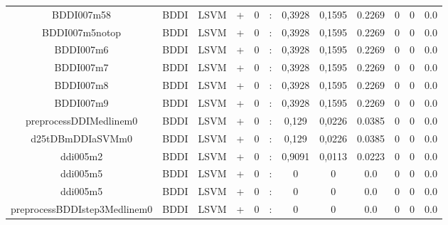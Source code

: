 \documentclass[a4paper]{article}
\begin{document}
\begin{landscape}
\begin{center}
\begin{tabular}{ |c|c|c|c|c|c|c|c|c|c|c|c|}
 
 	
 	\small{ BDDI007m58 } & BDDI & LSVM & +  &  0 &  :  &  0,3928 & 0,1595 & 0.2269  &  0 & 0 & 0.0 \\
 	

 
 	
 	\small{ BDDI007m5notop } & BDDI & LSVM & +  &  0 &  :  &  0,3928 & 0,1595 & 0.2269  &  0 & 0 & 0.0 \\
 	

 
 	
 	\small{ BDDI007m6 } & BDDI & LSVM & +  &  0 &  :  &  0,3928 & 0,1595 & 0.2269  &  0 & 0 & 0.0 \\
 	

 
 	
 	\small{ BDDI007m7 } & BDDI & LSVM & +  &  0 &  :  &  0,3928 & 0,1595 & 0.2269  &  0 & 0 & 0.0 \\
 	

 
 	
 	\small{ BDDI007m8 } & BDDI & LSVM & +  &  0 &  :  &  0,3928 & 0,1595 & 0.2269  &  0 & 0 & 0.0 \\
 	

 
 	
 	\small{ BDDI007m9 } & BDDI & LSVM & +  &  0 &  :  &  0,3928 & 0,1595 & 0.2269  &  0 & 0 & 0.0 \\
 	

 
 	
 	\small{ preprocessDDIMedlinem0 } & BDDI & LSVM & +  &  0 &  :  &  0,129 & 0,0226 & 0.0385  &  0 & 0 & 0.0 \\
 	

 
 	
 	\small{ d25tDBmDDIaSVMm0 } & BDDI & LSVM & +  &  0 &  :  &  0,129 & 0,0226 & 0.0385  &  0 & 0 & 0.0 \\
 	

 
 	
 	\small{ ddi005m2 } & BDDI & LSVM & +  &  0 &  :  &  0,9091 & 0,0113 & 0.0223  &  0 & 0 & 0.0 \\
 	

 
 	
 	\small{ ddi005m5 } & BDDI & LSVM & +  &  0 &  :  &  0 & 0 & 0.0  &  0 & 0 & 0.0 \\
 	

 
 	
 	\small{ ddi005m5 } & BDDI & LSVM & +  &  0 &  :  &  0 & 0 & 0.0  &  0 & 0 & 0.0 \\
 	

 
 	
 	\small{ preprocessBDDIstep3Medlinem0 } & BDDI & LSVM & +  &  0 &  :  &  0 & 0 & 0.0  &  0 & 0 & 0.0 \\
 	


\end{tabular}
\end{center}
\end{landscape}
\end{document}
